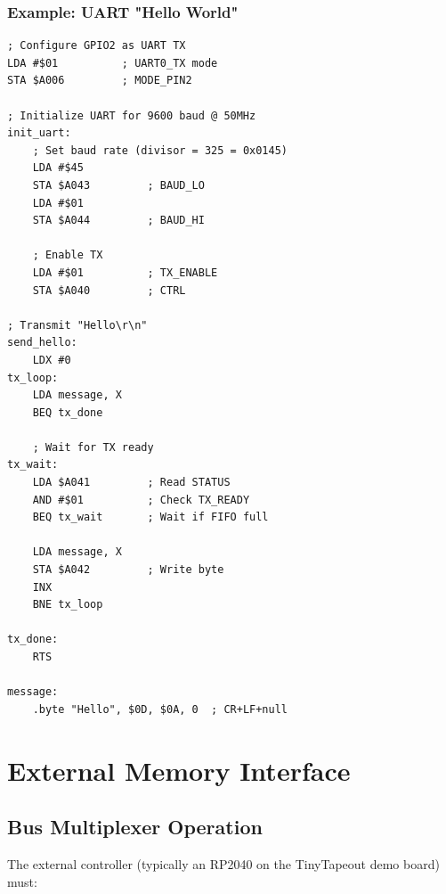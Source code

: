 \documentclass[11pt,a4paper]{article}
\begin{document}
\subsubsection{Example: UART "Hello World"}

\begin{lstlisting}[language=asm6502, caption=Transmit string via UART]
; Configure GPIO2 as UART TX
LDA #$01          ; UART0_TX mode
STA $A006         ; MODE_PIN2

; Initialize UART for 9600 baud @ 50MHz
init_uart:
    ; Set baud rate (divisor = 325 = 0x0145)
    LDA #$45
    STA $A043         ; BAUD_LO
    LDA #$01
    STA $A044         ; BAUD_HI

    ; Enable TX
    LDA #$01          ; TX_ENABLE
    STA $A040         ; CTRL

; Transmit "Hello\r\n"
send_hello:
    LDX #0
tx_loop:
    LDA message, X
    BEQ tx_done

    ; Wait for TX ready
tx_wait:
    LDA $A041         ; Read STATUS
    AND #$01          ; Check TX_READY
    BEQ tx_wait       ; Wait if FIFO full

    LDA message, X
    STA $A042         ; Write byte
    INX
    BNE tx_loop

tx_done:
    RTS

message:
    .byte "Hello", $0D, $0A, 0  ; CR+LF+null
\end{lstlisting}

\section{External Memory Interface}

\subsection{Bus Multiplexer Operation}

The external controller (typically an RP2040 on the TinyTapeout demo board) must:
\end{document}
